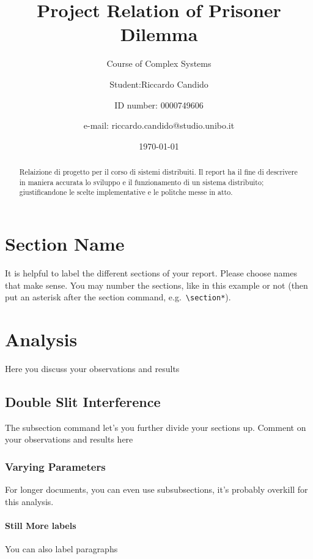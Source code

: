 \documentclass{llncs}
\begin{document}
\title{Project Relation of Prisoner Dilemma}
\subtitle{Course of Complex Systems}

\author{Student:Riccardo Candido}
\author{ID number: 0000749606}
\author{e-mail: riccardo.candido@studio.unibo.it}
\date{\today}

\maketitle

\begin{abstract}
	Relaizione di progetto per il corso di sistemi distribuiti. Il report ha il fine di descrivere in maniera accurata lo sviluppo e il funzionamento di un sistema distribuito; giustificandone le scelte implementative e le politche messe in atto. 
\end{abstract}

\section{Section Name}
	It is helpful to label the different sections of your report.
    Please choose names that make sense.  You may number the sections, like in this example or not (then put an asterisk after the section command, e.g.~\verb+\section*+). 
    
    
\section{Analysis}
	Here you discuss your observations and results
	
    \subsection{Double Slit Interference}
		The subsection command let's you further divide your sections up.  Comment on your observations and results here
        
        \subsubsection{Varying Parameters}
        	For longer documents, you can even use subsubsections, 
            it's probably overkill for this analysis.
            
            \paragraph{Still More labels}
            	You can also label paragraphs
                
\end{document}
